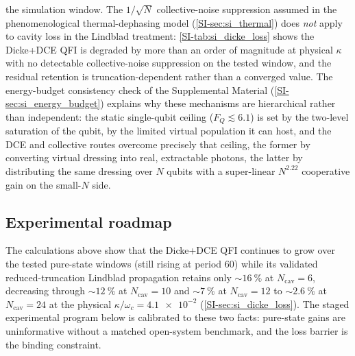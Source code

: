 \documentclass[aps,prxquantum,preprint,superscriptaddress,amsmath,amssymb]{revtex4-2}
\begin{document}
the simulation window. The $1/\sqrt{N}$ collective-noise suppression assumed in the phenomenological thermal-dephasing model (\cref{SI-sec:si_thermal}) does \emph{not} apply to cavity loss in the Lindblad treatment: \cref{SI-tab:si_dicke_loss} shows the Dicke+DCE QFI is degraded by more than an order of magnitude at physical $\kappa$ with no detectable collective-noise suppression on the tested window, and the residual retention is truncation-dependent rather than a converged value. The energy-budget consistency check of the Supplemental Material (\cref{SI-sec:si_energy_budget}) explains why these mechanisms are hierarchical rather than independent: the static single-qubit ceiling ($F_Q\lesssim\num{6.1}$) is set by the two-level saturation of the qubit, by the limited virtual population it can host, and the DCE and collective routes overcome precisely that ceiling, the former by converting virtual dressing into real, extractable photons, the latter by distributing the same dressing over $N$ qubits with a super-linear $N^{\num{2.22}}$ cooperative gain on the small-$N$ side.

\subsection{Experimental roadmap}

The calculations above show that the Dicke+DCE QFI continues to grow over the tested pure-state windows (still rising at period \num{60}) while its validated reduced-truncation Lindblad propagation retains only $\sim\qty{16}{\percent}$ at $N_{\text{cav}}=\num{6}$, decreasing through $\sim\qty{12}{\percent}$ at $N_{\text{cav}}=\num{10}$ and $\sim\qty{7}{\percent}$ at $N_{\text{cav}}=\num{12}$ to $\sim\qty{2.6}{\percent}$ at $N_{\text{cav}}=\num{24}$ at the physical $\kappa/\omega_c = \num{4.1e-2}$ (\cref{SI-sec:si_dicke_loss}). The staged experimental program below is calibrated to these two facts: pure-state gains are uninformative without a matched open-system benchmark, and the loss barrier is the binding constraint.
\end{document}
